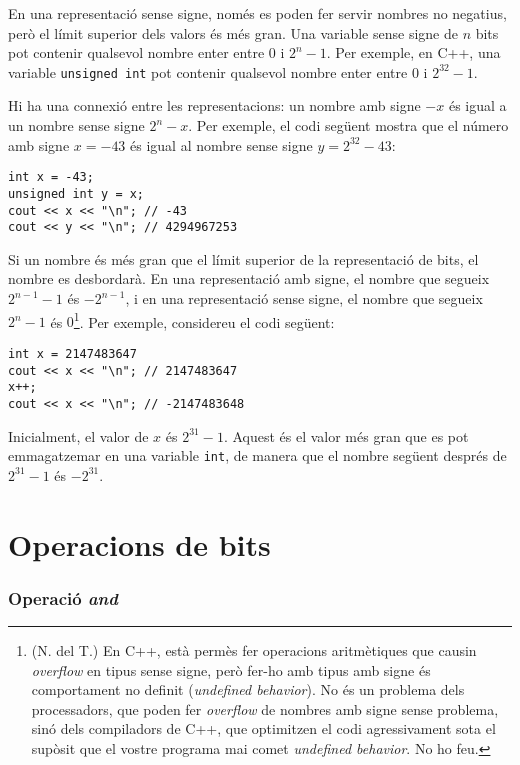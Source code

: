 En una representació sense signe, només es poden fer servir nombres no
negatius, però el límit superior dels valors és més gran. Una variable
sense signe de $n$ bits pot contenir qualsevol nombre enter entre $0$
i $2^n-1$. Per exemple, en C++, una variable \texttt{unsigned int} pot
contenir qualsevol nombre enter entre $0$ i $2^{32}-1$.

Hi ha una connexió entre les representacions: un nombre amb signe $-x$ és
igual a un nombre sense signe $2^n-x$. Per exemple, el codi següent
mostra que el número amb signe $x=-43$ és igual al nombre sense signe
$y=2^{32}-43$:
\begin{lstlisting}
int x = -43;
unsigned int y = x;
cout << x << "\n"; // -43
cout << y << "\n"; // 4294967253
\end{lstlisting}


Si un nombre és més gran que el límit superior de la representació de
bits, el nombre es desbordarà. En una representació amb signe, el
nombre que segueix $2^{n-1}-1$ és $-2^{n-1}$, i en una representació
sense signe, el nombre que segueix $2^n-1$ és $0$\footnote{(N. del T.)
En C++, està permès fer operacions aritmètiques que causin
\emph{overflow} en tipus sense signe, però fer-ho amb tipus amb signe
és comportament no definit (\emph{undefined behavior}). No és un
problema dels processadors, que poden fer \emph{overflow} de nombres
amb signe sense problema, sinó dels compiladors de C++, que optimitzen
el codi agressivament sota el supòsit que el vostre programa mai comet
\emph{undefined behavior}. No ho feu.}. Per exemple, considereu el
codi següent:
\begin{lstlisting}
int x = 2147483647
cout << x << "\n"; // 2147483647
x++;
cout << x << "\n"; // -2147483648
\end{lstlisting}

Inicialment, el valor de $x$ és $2^{31}-1$. Aquest és el valor més
gran que es pot emmagatzemar en una variable \texttt{int}, de manera
que el nombre següent després de $2^{31}-1$ és $-2^{31}$.



\section{Operacions de bits}

\newcommand\XOR{\mathbin{\char`\^}}

\subsubsection{Operació \emph{and}}

